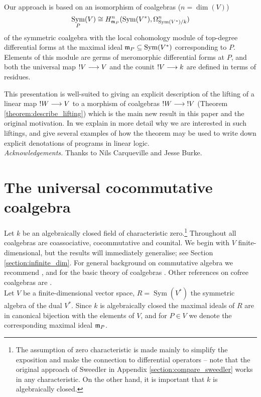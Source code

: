 \documentclass[english,letter paper,12pt,reqno]{article}
\theoremstyle{example}
\numberwithin{equation}{section}
\DeclareMathOperator{\Sym}{Sym}
\begin{document}
Our approach is based on an isomorphism of coalgebras ($n = \dim(V)$)
\begin{equation}\label{eq:lc}
\Sym_P(V) \cong H^{n}_{\mf{m}_P}(\Sym(V^*), \Omega^n_{\Sym(V^*)/k})
\end{equation}
of the symmetric coalgebra with the local cohomology module of top-degree differential forms at the maximal ideal $\mf{m}_P \subseteq \Sym(V^*)$ corresponding to $P$. Elements of this module are germs of meromorphic differential forms at $P$, and both the universal map ${!} V \longrightarrow V$ and the counit ${!} V \longrightarrow k$ are defined in terms of residues.

This presentation is well-suited to giving an explicit description of the lifting of a linear map ${!} W \longrightarrow V$ to a morphism of coalgebras ${!} W \longrightarrow {!} V$ (Theorem \ref{theorem:describe_lifting}) which is the main new result in this paper and the original motivation. In \cite{murfet_ll} we explain in more detail why we are interested in such liftings, and give several examples of how the theorem may be used to write down explicit denotations of programs in linear logic.
\\

\emph{Acknowledgements.} Thanks to Nils Carqueville and Jesse Burke.

\section{The universal cocommutative coalgebra}\label{section:expmod}

Let $k$ be an algebraically closed field of characteristic zero.\footnote{The assumption of zero characteristic is made mainly to simplify the exposition and make the connection to differential operators -- note that the original approach of Sweedler in Appendix \ref{section:compare_sweedler} works in any characteristic. On the other hand, it is important that $k$ is algebraically closed.} Throughout all coalgebras are coassociative, cocommutative and counital. We begin with $V$ finite-dimensional, but the results will immediately generalise; see Section \ref{section:infinite_dim}. For general background on commutative algebra we recommend \cite{eisenbud}, and for the basic theory of coalgebras \cite{sweedler}. Other references on cofree coalgebras are \cite{getzler, anel, block-leroux, hazewinkel, smith, barr}.
\\

Let $V$ be a finite-dimensional vector space, $R = \Sym(V^*)$ the symmetric algebra of the dual $V^*$. Since $k$ is algebraically closed the maximal ideals of $R$ are in canonical bijection with the elements of $V$, and for $P \in V$ we denote the corresponding maximal ideal $\mathfrak{m}_P$. 
\end{document}
